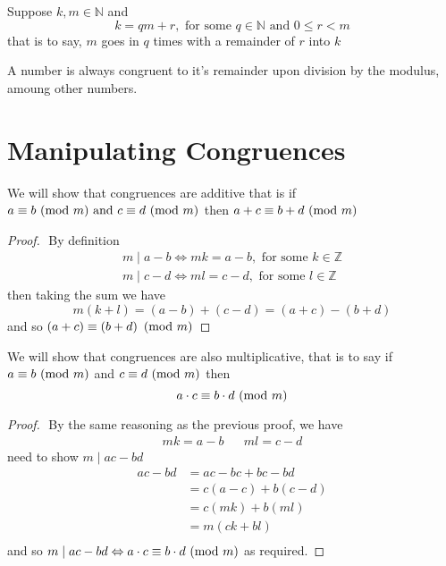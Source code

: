 \documentclass[11pt]{book}
\begin{document}
Suppose $k, m \in \mathbb{N} $ and 
\[
k = qm  + r, \text{ for some } q \in \mathbb{N} \text{ and } 0 \le r < m
\]
that is to say, $m$ goes in $q$ times with a remainder of $r$ into $k$ 

\begin{crly}
    A number is always congruent to it's remainder upon division by the modulus, amoung other numbers.
\end{crly}

\newpage

\section{Manipulating Congruences}%
\label{sec:manipulating_congruences}

We will show that congruences are additive that is if $a \equiv b \ (\mathrm{mod}\ m) \text{ and } c \equiv d \ (\mathrm{mod}\ m) $ then $a + c \equiv b + d \ (\mathrm{mod}\ m) $ 
\begin{proof}
    $ $\newline
    By definition 
    \begin{gather*}
        m \mid a - b \Leftrightarrow mk = a - b, \text{ for some } k \in \mathbb{Z} \\
        m \mid c  - d \Leftrightarrow ml = c  - d, \text{ for some } l \in \mathbb{Z} 
    \end{gather*}
    then taking the sum we have 
    \[
        m\left( k + l \right) = \left( a - b \right)  + \left( c  - d \right) = \left( a + c \right)  - \left( b + d \right) 
    \]
    and so $\left( a + c \right)  \equiv \left( b + d \right)  \ (\mathrm{mod}\ m) $ 
\end{proof}

We will show that congruences are also multiplicative, that is to say if $a \equiv b \ (\mathrm{mod}\ m) $ and $c \equiv d \ (\mathrm{mod}\ m) $ then 
\[
a \cdot c \equiv b \cdot d \ (\mathrm{mod}\ m) 
\]
\begin{proof}
$ $\newline
    By the same reasoning as the previous proof, we have 
    \begin{align*}
        mk = a - b && ml = c  - d
    \end{align*}
    need to show $m \mid ac  - bd$ 
    \begin{align*}
        ac - bd &= ac  - bc  + bc  - bd  \\ 
        &= c\left( a - c \right)  + b\left( c - d \right)   \\ 
        &= c\left( mk \right)  + b\left( ml\right)   \\ 
        &= m\left( ck  + bl \right)   \\ 
    \end{align*}
    and so $m \mid ac  - bd \Leftrightarrow a \cdot c \equiv b \cdot d \ (\mathrm{mod}\ m) $ as required. 
\end{proof}
\end{document}
